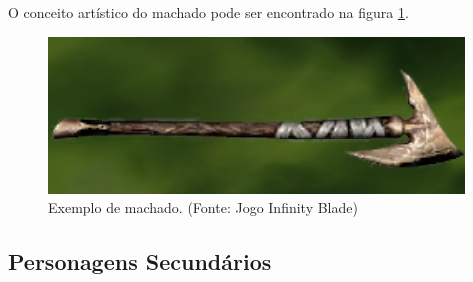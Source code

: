 \begin{itemize}
O conceito artístico do machado pode ser encontrado na figura 
\ref{img:machado}.

\begin{figure}[!ht]
 \centering
 \includegraphics[scale=1]{Imagens/machado01.png}
 \caption{Exemplo de machado. (Fonte: Jogo Infinity Blade)}
\label{img:machado}
\end{figure}

\end{itemize}

\subsection{Personagens Secundários}
